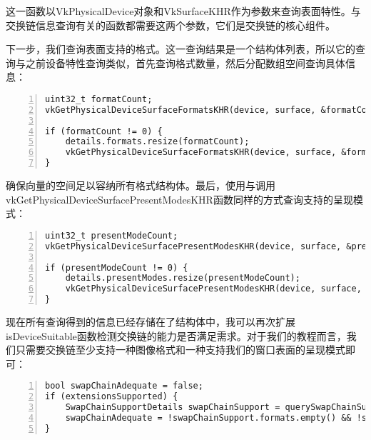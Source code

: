 \documentclass{ctexart}
\begin{document}
这一函数以VkPhysicalDevice对象和VkSurfaceKHR作为参数来查询表面特性。与交换链信息查询有关的函数都需要这两个参数，它们是交换链的核心组件。

下一步，我们查询表面支持的格式。这一查询结果是一个结构体列表，所以它的查询与之前设备特性查询类似，首先查询格式数量，然后分配数组空间查询具体信息：

\begin{lstlisting}[language={[ANSI]C},keywordstyle=\color{blue!70},commentstyle=\color{red!50!green!50!blue!50},frame=shadowbox, rulesepcolor=\color{red!20!green!20!blue!20},basicstyle=\small,numbers=left, numberstyle=\tiny,breaklines=true]
uint32_t formatCount;
vkGetPhysicalDeviceSurfaceFormatsKHR(device, surface, &formatCount, nullptr);

if (formatCount != 0) {
	details.formats.resize(formatCount);
	vkGetPhysicalDeviceSurfaceFormatsKHR(device, surface, &formatCount, details.formats.data());
}
\end{lstlisting}

确保向量的空间足以容纳所有格式结构体。最后，使用与调用vkGetPhysicalDeviceSurfacePresentModesKHR函数同样的方式查询支持的呈现模式：

\begin{lstlisting}[language={[ANSI]C},keywordstyle=\color{blue!70},commentstyle=\color{red!50!green!50!blue!50},frame=shadowbox, rulesepcolor=\color{red!20!green!20!blue!20},basicstyle=\small,numbers=left, numberstyle=\tiny,breaklines=true]
uint32_t presentModeCount;
vkGetPhysicalDeviceSurfacePresentModesKHR(device, surface, &presentModeCount, nullptr);

if (presentModeCount != 0) {
	details.presentModes.resize(presentModeCount);
	vkGetPhysicalDeviceSurfacePresentModesKHR(device, surface, &presentModeCount, details.presentModes.data());
}
\end{lstlisting}

现在所有查询得到的信息已经存储在了结构体中，我可以再次扩展isDeviceSuitable函数检测交换链的能力是否满足需求。对于我们的教程而言，我们只需要交换链至少支持一种图像格式和一种支持我们的窗口表面的呈现模式即可：

\begin{lstlisting}[language={[ANSI]C},keywordstyle=\color{blue!70},commentstyle=\color{red!50!green!50!blue!50},frame=shadowbox, rulesepcolor=\color{red!20!green!20!blue!20},basicstyle=\small,numbers=left, numberstyle=\tiny,breaklines=true]
bool swapChainAdequate = false;
if (extensionsSupported) {
	SwapChainSupportDetails swapChainSupport = querySwapChainSupport(device);
	swapChainAdequate = !swapChainSupport.formats.empty() && !swapChainSupport.presentModes.empty();
}
\end{lstlisting}
\end{document}
